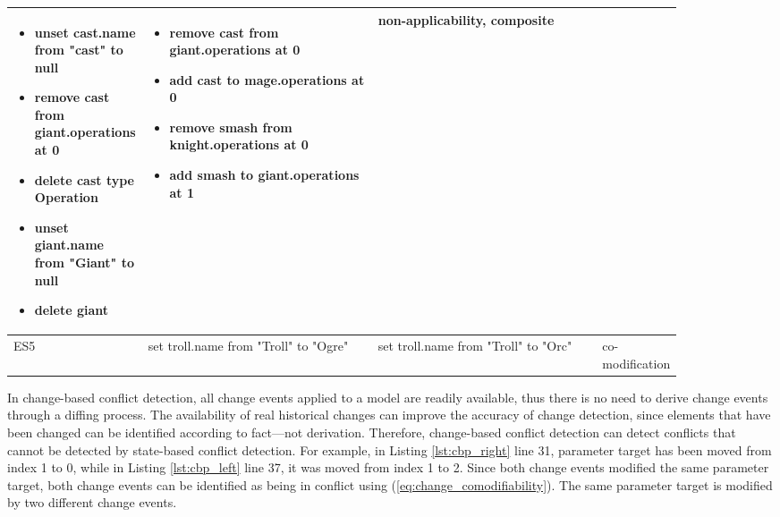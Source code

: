 \begin{table*}[ht]
\begin{scriptsize}
\begin{tabular}{|p{0.04\linewidth}|p{0.36\linewidth}|p{0.36\linewidth}|
        p{0.11\linewidth}|}
\begin{minipage}[t]{\linewidth}
        \begin{itemize}[leftmargin=0pt]
          \setlength
          \item[] unset cast.name from "cast" to null
          \item[] remove cast from giant.operations at 0
          \item[] delete cast type Operation
          \item[] unset giant.name from "Giant" to null
          \item[] delete giant
        \end{itemize}
      \end{minipage}
      &
      \begin{minipage}[t]{\linewidth}
        \raggedright
        \begin{itemize}[leftmargin=0pt]
          \setlength
          \item[] remove cast from giant.operations at 0
          \item[] add cast to mage.operations at 0
          \item[] remove smash from knight.operations at 0
          \item[] add smash to giant.operations at 1
        \end{itemize}
      \end{minipage}
      &
      non-applicability, composite\\
      \hline
      ES5 &
      set troll.name from "Troll" to "Ogre" &
      set troll.name from "Troll" to "Orc" &
      co-modification\\
      \hline
    \end{tabular}
  \end{scriptsize}
\end{table*}

In change-based conflict detection, all change events applied to a model are readily available, thus there is no need to derive change events through a diffing process. The availability of real historical changes can improve the accuracy of change detection, since elements that have been changed can be identified according to fact—not derivation. Therefore, change-based conflict detection can detect conflicts that cannot be detected by state-based conflict detection. For example, in Listing \ref{lst:cbp_right} line 31, parameter \textsf{target} has been moved from index 1 to 0, while in Listing \ref{lst:cbp_left} line 37, it was moved from index 1 to 2. Since both change events modified the same parameter \textsf{target}, both change events can be identified as being in conflict using (\ref{eq:change_comodifiability}). The same parameter \textsf{target} is modified by two different change events.

